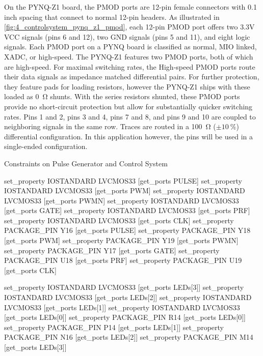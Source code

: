 On the PYNQ-Z1 board, the PMOD ports are 12-pin female connectors with 0.1 inch spacing that connect to normal 12-pin headers. As illustrated in \cref{fig:4_controlsystem_pynq_z1_pmod}, each 12-pin PMOD port offers two 3.3V VCC signals (pins 6 and 12), two GND signals (pins 5 and 11), and eight logic signals. Each PMOD port on a PYNQ board is classified as normal, MIO linked, XADC, or high-speed. The PYNQ-Z1 features two PMOD ports, both of which are high-speed. For maximal switching rates, the High-speed PMOD ports route their data signals as impedance matched differential pairs. For further protection, they feature pads for loading resistors, however the PYNQ-Z1 ships with these loaded as \qty{0}{\ohm} shunts. With the series resistors shunted, these PMOD ports provide no short-circuit protection but allow for substantially quicker switching rates. Pins 1 and 2, pins 3 and 4, pins 7 and 8, and pins 9 and 10 are coupled to neighboring signals in the same row. Traces are routed in a \qty{100}{\ohm} ($\pm\qty{10}{\percent}$) differential configuration. In this application however, the pins will be used in a single-ended configuration.

\begin{listing}[htbp]
	\caption{Constraints on Pulse Generator and Control System}
	\label{lst:4_controlsystem_constraints}
	\begin{mintedvhdl}
set_property IOSTANDARD LVCMOS33 [get_ports PULSE]
set_property IOSTANDARD LVCMOS33 [get_ports PWM]
set_property IOSTANDARD LVCMOS33 [get_ports PWMN]
set_property IOSTANDARD LVCMOS33 [get_ports GATE]
set_property IOSTANDARD LVCMOS33 [get_ports PRF]
set_property IOSTANDARD LVCMOS33 [get_ports CLK]
set_property PACKAGE_PIN Y16 [get_ports PULSE]
set_property PACKAGE_PIN Y18 [get_ports PWM]
set_property PACKAGE_PIN Y19 [get_ports PWMN]
set_property PACKAGE_PIN Y17 [get_ports GATE]
set_property PACKAGE_PIN U18 [get_ports PRF]
set_property PACKAGE_PIN U19 [get_ports CLK]

set_property IOSTANDARD LVCMOS33 [get_ports {LEDs[3]}]
set_property IOSTANDARD LVCMOS33 [get_ports {LEDs[2]}]
set_property IOSTANDARD LVCMOS33 [get_ports {LEDs[1]}]
set_property IOSTANDARD LVCMOS33 [get_ports {LEDs[0]}]
set_property PACKAGE_PIN R14 [get_ports {LEDs[0]}]
set_property PACKAGE_PIN P14 [get_ports {LEDs[1]}]
set_property PACKAGE_PIN N16 [get_ports {LEDs[2]}]
set_property PACKAGE_PIN M14 [get_ports {LEDs[3]}]
	\end{mintedvhdl}
\end{listing}


